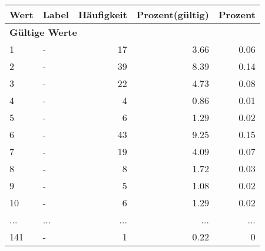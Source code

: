      \begin{longtable}{lXrrr}
     \toprule
     \textbf{Wert} & \textbf{Label} & \textbf{Häufigkeit} & \textbf{Prozent(gültig)} & \textbf{Prozent} \\
     \endhead
     \midrule
     \multicolumn{5}{l}{\textbf{Gültige Werte}}\\
        1 & \multicolumn{1}{X}{-} & %
          \num{17} &
          \num[round-mode=places,round-precision=2]{3,66} &
          \num[round-mode=places,round-precision=2]{0,06} \\
        2 & \multicolumn{1}{X}{-} & %
          \num{39} &
          \num[round-mode=places,round-precision=2]{8,39} &
          \num[round-mode=places,round-precision=2]{0,14} \\
        3 & \multicolumn{1}{X}{-} & %
          \num{22} &
          \num[round-mode=places,round-precision=2]{4,73} &
          \num[round-mode=places,round-precision=2]{0,08} \\
        4 & \multicolumn{1}{X}{-} & %
          \num{4} &
          \num[round-mode=places,round-precision=2]{0,86} &
          \num[round-mode=places,round-precision=2]{0,01} \\
        5 & \multicolumn{1}{X}{-} & %
          \num{6} &
          \num[round-mode=places,round-precision=2]{1,29} &
          \num[round-mode=places,round-precision=2]{0,02} \\
        6 & \multicolumn{1}{X}{-} & %
          \num{43} &
          \num[round-mode=places,round-precision=2]{9,25} &
          \num[round-mode=places,round-precision=2]{0,15} \\
        7 & \multicolumn{1}{X}{-} & %
          \num{19} &
          \num[round-mode=places,round-precision=2]{4,09} &
          \num[round-mode=places,round-precision=2]{0,07} \\
        8 & \multicolumn{1}{X}{-} & %
          \num{8} &
          \num[round-mode=places,round-precision=2]{1,72} &
          \num[round-mode=places,round-precision=2]{0,03} \\
        9 & \multicolumn{1}{X}{-} & %
          \num{5} &
          \num[round-mode=places,round-precision=2]{1,08} &
          \num[round-mode=places,round-precision=2]{0,02} \\
        10 & \multicolumn{1}{X}{-} & %
          \num{6} &
          \num[round-mode=places,round-precision=2]{1,29} &
          \num[round-mode=places,round-precision=2]{0,02} \\
       ... & ... & ... & ... & ... \\
        141 & \multicolumn{1}{X}{-} & %
          \num{1} &
          \num[round-mode=places,round-precision=2]{0,22} &
          \num[round-mode=places,round-precision=2]{0} \\


\end{longtable}

